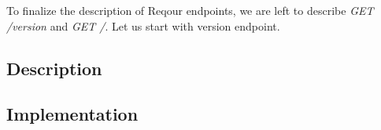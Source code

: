 \documentclass[../main.tex]{subfiles}
\begin{document}
To finalize the description of Reqour endpoints, we are left to describe \textit{GET /version} and \textit{GET /}. Let us start with version endpoint.

\subsection{Description}


\subsection{Implementation}

\end{document}

